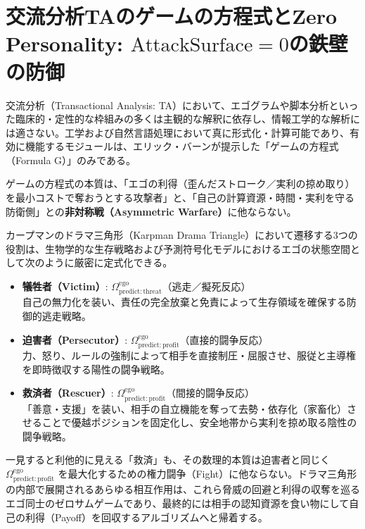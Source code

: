\chapter{交流分析TAのゲームの方程式とZero Personality\texttrademark : $\mathrm{Attack Surface} = 0$の鉄壁の防御}
\usetikzlibrary{arrows.meta, positioning, calc}

交流分析（Transactional Analysis: TA）において、エゴグラムや脚本分析といった臨床的・定性的な枠組みの多くは主観的な解釈に依存し、情報工学的な解析には適さない。工学および自然言語処理において真に形式化・計算可能であり、有効に機能するモジュールは、エリック・バーンが提示した「ゲームの方程式（Formula G）」のみである。

ゲームの方程式の本質は、「エゴの利得（歪んだストローク／実利の掠め取り）を最小コストで奪おうとする攻撃者」と、「自己の計算資源・時間・実利を守る防衛側」との\textbf{非対称戦（Asymmetric Warfare）}に他ならない。

カープマンのドラマ三角形（Karpman Drama Triangle）において遷移する3つの役割は、生物学的な生存戦略および予測符号化モデルにおけるエゴの状態空間として次のように厳密に定式化できる。

\begin{itemize}
    \item \textbf{犠牲者（Victim）}: $\Omega^{\mathrm{ego}}_{\mathrm{predict:threat}}$（逃走／擬死反応）\\
    自己の無力化を装い、責任の完全放棄と免責によって生存領域を確保する防御的逃走戦略。
    
    \item \textbf{迫害者（Persecutor）}: $\Omega^{\mathrm{ego}}_{\mathrm{predict:profit}}$（直接的闘争反応）\\
    力、怒り、ルールの強制によって相手を直接制圧・屈服させ、服従と主導権を即時徴収する陽性の闘争戦略。
    
    \item \textbf{救済者（Rescuer）}: $\Omega^{\mathrm{ego}}_{\mathrm{predict:profit}}$（間接的闘争反応）\\
    「善意・支援」を装い、相手の自立機能を奪って去勢・依存化（家畜化）させることで優越ポジションを固定化し、安全地帯から実利を掠め取る陰性の闘争戦略。
\end{itemize}

一見すると利他的に見える「救済」も、その数理的本質は迫害者と同じく $\Omega^{\mathrm{ego}}_{\mathrm{predict:profit}}$ を最大化するための権力闘争（Fight）に他ならない。ドラマ三角形の内部で展開されるあらゆる相互作用は、これら脅威の回避と利得の収奪を巡るエゴ同士のゼロサムゲームであり、最終的には相手の認知資源を食い物にして自己の利得（Payoff）を回収するアルゴリズムへと帰着する。

